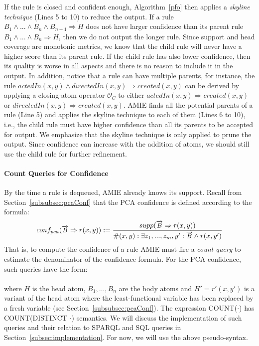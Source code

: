 {If the rule is closed and confident enough, Algorithm~\ref{pfo} then applies a \emph{skyline technique} (Lines 5 to 10)
to reduce the output. If a rule $B_1 \wedge ... \wedge B_n \wedge B_{n+1} \Rightarrow H$ does not have larger confidence
than its parent rule $B_1 \wedge ... \wedge B_n \Rightarrow H$, then we do not output the longer rule.
Since support and head coverage are monotonic metrics, we know that the child rule will never have a higher score than its parent rule. 
If the child rule has also lower confidence, then its quality is worse in all aspects and there is 
no reason to include it in the output.
In addition, notice that a rule can have multiple parents, for instance, the rule $actedIn(x,y) \wedge directedIn(x,y) \Rightarrow created(x,y)$
can be derived by applying a closing-atom operator $\mathcal{O}_C$ to either $actedIn(x,y) \Rightarrow created(x,y)$ or
$directedIn(x,y) \Rightarrow created(x,y)$. AMIE
finds all the potential parents of a rule (Line 5) and applies the skyline technique to each of them (Lines 6 to 10), i.e., the child
rule must have higher confidence than all its parents to be accepted for output.
We emphasize that the skyline technique is only applied to prune the output. 
Since confidence can increase with the addition of atoms, we should still use the child rule 
for further refinement.

\paragraph{Count Queries for Confidence} \label{countQueries} By the time a rule is dequeued, AMIE already knows its support. 
Recall from Section~\ref{subsubsec:pcaConf} that the PCA confidence is defined according to the formula:
\[
\begin{small}
conf_{pca}(\vec{B} \Rightarrow r(x,y)) := \frac{supp(\vec{B} \Rightarrow r(x,y))}{\#(x,y): \exists z_1,...,z_m,y': \vec{B} \wedge r(x,y')}
\end{small}
\]
That is, to compute the confidence of a rule AMIE must fire a \emph{count query} to estimate the denominator
of the confidence formula. For the PCA confidence, such queries have the form: \\

 \\

\noindent where $H$ is the head atom, $B_1, \dots, B_n$ are the body atoms and $H'= r'(x,y')$ is a variant of the
head atom where the least-functional variable has been replaced by a fresh variable (see Section~\ref{subsubsec:pcaConf}).
The expression COUNT($\cdot$) has COUNT(DISTINCT $\cdot$) semantics.
We will discuss the implementation of such queries and their relation to SPARQL and SQL queries in Section~\ref{subsec:implementation}. 
For now, we will use the above pseudo-syntax.

}

